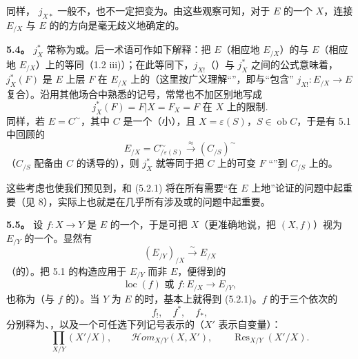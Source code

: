 同样， $j_{X*}$ 一般不，也不一定把变为。由这些观察可知，对于 $E$ 的一个 $X$，连接 $E_{/X}$ 与 $E$ 的的方向是毫无歧义地确定的。

\textbf{5.4。}  $j_X^*$ 常称为或。后一术语可作如下解释：把 $E$（相应地 $E_{/X}$）的与 $E$（相应地 $E_{/X}$）上的等同（1.2 iii)）；在此等同下，$j_{X!}$（）与 $j_X^*$ 之间的公式意味着，$j_X^*(F)$ 是 $E$ 上层 $F$ 在 $E_{/X}$ 上的（这里按广义理解“”，即与“包含” $j_{X!}:E_{/X}\to E$ 复合）。沿用其他场合中熟悉的记号，常常也不加区别地写成
\[j_X^*(F)=F|X=F_X=\text{$F$ 在 $X$ 上的限制}.\tag{5.4.1}\]
同样，若 $E=C^\sim$，其中 $C$ 是一个（小），且 $X=\varepsilon(S)$，$S\in\operatorname{ob}C$，于是有 5.1 中回顾的
\[E_{/X}=C^\sim_{/\varepsilon(S)}\xrightarrow{\approx}(C_{/S})^\sim\]
（$C_{/S}$ 配备由 $C$ 的诱导的），则 $j_X^*$ 就等同于把 $C$ 上的可变 $F$ “”到 $C_{/S}$ 上的。

这些考虑也使我们预见到，和 (5.2.1) 将在所有需要“在 $E$ 上地”论证的问题中起重要（见 8），实际上也就是在几乎所有涉及或的问题中起重要。

\textbf{5.5。} 设 $f:X\to Y$ 是 $E$ 的一个，于是可把 $X$（更准确地说，把 $(X,f)$）视为 $E_{/Y}$ 的一个。显然有
\[(E_{/Y})_{/X}\xrightarrow{\sim}E_{/X}\tag{5.5.1}\]
（的）。把 5.1 的构造应用于 $E_{/Y}$ 而非 $E$，便得到的
\[\operatorname{loc}(f)\text{ 或 }f:E_{/X}\longrightarrow E_{/Y},\tag{5.5.2}\]
也称为（与 $f$ 的）。当 $Y$ 为 $E$ 的时，基本上就得到 (5.2.1)。$f$ 的于三个依次的
\[f_!,\quad f^*,\quad f_*,\tag{5.5.3}\]
分别释为、，以及一个可任选下列记号表示的（$X'$ 表示自变量）：
\[\prod_{X/Y}(X'/X),\qquad\mathscr{H}om_{X/Y}(X,X'),\qquad\operatorname{Res}_{X/Y}(X'/X).\]

